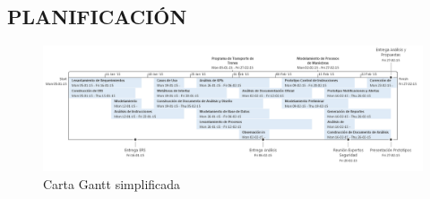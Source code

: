 \documentclass[oneside,12pt, letterpaper, titlepage]{book}
\begin{document}
\begin{appendices}
\renewcommand\appendixname{Anexo}

\chapter[Planificación]{PLANIFICACIÓN}
\begin{figure}[H]
\centering
    \includegraphics[angle=90,scale=0.60]{./images/Gantt}
    \caption{Carta Gantt simplificada}
    \label{fig:Gantt}
\end{figure}


\end{appendices}
\end{document}
